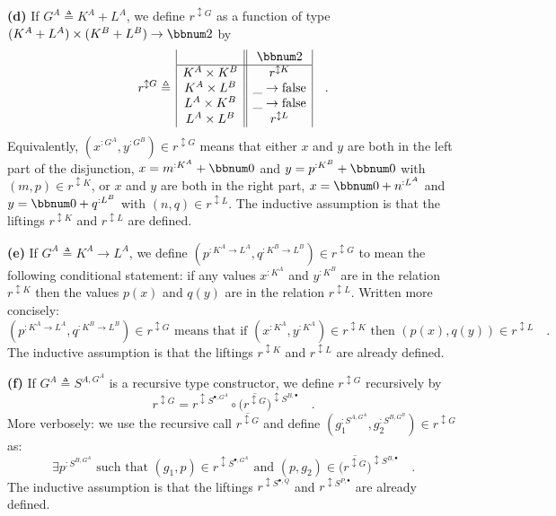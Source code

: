 \textbf{(d)} If $G^{A}\triangleq K^{A}+L^{A}$, we define $r^{\updownarrow G}$
as a function of type $(K^{A}+L^{A})\times(K^{B}+L^{B})\rightarrow\bbnum 2$
by
\[
r^{\updownarrow G}\triangleq\,\begin{array}{|c||c|}
 & \bbnum 2\\
\hline K^{A}\times K^{B} & r^{\updownarrow K}\\
K^{A}\times L^{B} & \_\rightarrow\text{false}\\
L^{A}\times K^{B} & \_\rightarrow\text{false}\\
L^{A}\times L^{B} & r^{\updownarrow L}
\end{array}\quad.
\]
Equivalently, $(x^{:G^{A}},y^{:G^{B}})\in r^{\updownarrow G}$ means
that either $x$ and $y$ are both in the left part of the disjunction,
$x=m^{:K^{A}}+\bbnum 0$ and $y=p^{:K^{B}}+\bbnum 0$ with $(m,p)\in r^{\updownarrow K}$,
or $x$ and $y$ are both in the right part, $x=\bbnum 0+n^{:L^{A}}$
and $y=\bbnum 0+q^{:L^{B}}$ with $(n,q)\in r^{\updownarrow L}$.
The inductive assumption is that the liftings $r^{\updownarrow K}$
and $r^{\updownarrow L}$ are defined.

\textbf{(e)} If $G^{A}\triangleq K^{A}\rightarrow L^{A}$, we define
$(p^{:K^{A}\rightarrow L^{A}},q^{:K^{B}\rightarrow L^{B}})\in r^{\updownarrow G}$
to mean the following conditional statement: if any values $x^{:K^{A}}$
and $y^{:K^{B}}$ are in the relation $r^{\updownarrow K}$ then the
values $p(x)$ and $q(y)$ are in the relation $r^{\updownarrow L}$.
Written more concisely:
\[
(p^{:K^{A}\rightarrow L^{A}},q^{:K^{B}\rightarrow L^{B}})\in r^{\updownarrow G}\text{ means that if }(x^{:K^{A}},y^{:K^{A}})\in r^{\updownarrow K}\text{ then }(p(x),q(y))\in r^{\updownarrow L}\quad.
\]
The inductive assumption is that the liftings $r^{\updownarrow K}$
and $r^{\updownarrow L}$ are already defined.

\textbf{(f)} If $G^{A}\triangleq S^{A,G^{A}}$ is a recursive type
constructor, we define $r^{\updownarrow G}$ recursively by
\[
r^{\updownarrow G}=r^{\updownarrow S^{\bullet,G^{A}}}\circ\big(\overline{r^{\updownarrow G}}\big)^{\updownarrow S^{B,\bullet}}\quad.
\]
More verbosely: we use the recursive call $\overline{r^{\updownarrow G}}$
and define $(g_{1}^{:S^{A,G^{A}}},g_{2}^{:S^{B,G^{B}}})\in r^{\updownarrow G}$
as:
\[
\exists p^{:S^{B,G^{A}}}\text{ such that }(g_{1},p)\in r^{\updownarrow S^{\bullet,G^{A}}}\text{ and }(p,g_{2})\in\big(\overline{r^{\updownarrow G}}\big)^{\updownarrow S^{B,\bullet}}\quad.
\]
The inductive assumption is that the liftings $r^{\updownarrow S^{\bullet,Q}}$
and $r^{\updownarrow S^{P,\bullet}}$ are already defined. 

